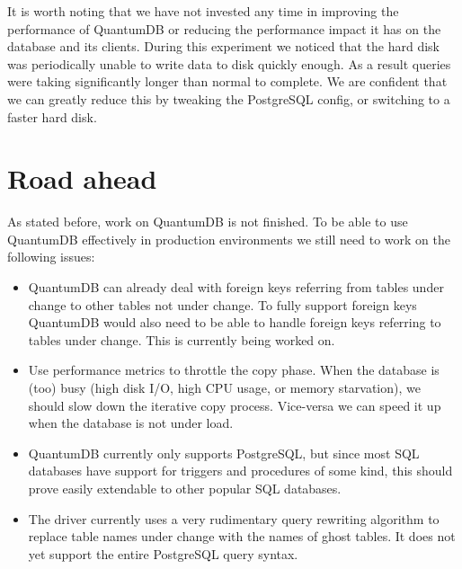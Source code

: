 \documentclass[conference]{IEEEtran}
\begin{document}
It is worth noting that we have not invested any time in improving the performance of QuantumDB or reducing the performance impact it has on the database and its clients. During this experiment we noticed that the hard disk was periodically unable to write data to disk quickly enough. As a result queries were taking significantly longer than normal to complete. We are confident that we can greatly reduce this by tweaking the PostgreSQL config, or switching to a faster hard disk.

\section{Road ahead}
As stated before, work on QuantumDB is not finished. To be able to use QuantumDB effectively in production environments we still need to work on the following issues: 

\begin{itemize}
  \item{QuantumDB can already deal with foreign keys referring from tables under change to other tables not under change. To fully support foreign keys QuantumDB would also need to be able to handle foreign keys referring to tables under change. This is currently being worked on.}
  \item{Use performance metrics to throttle the copy phase. When the database is (too) busy (high disk I/O, high CPU usage, or memory starvation), we should slow down the iterative copy process. Vice-versa we can speed it up when the database is not under load.}
  \item{QuantumDB currently only supports PostgreSQL, but since most SQL databases have support for triggers and procedures of some kind, this should prove easily extendable to other popular SQL databases.}
  \item{The driver currently uses a very rudimentary query rewriting algorithm to replace table names under change with the names of ghost tables. It does not yet support the entire PostgreSQL query syntax.}
\end{itemize}



%
%
\end{document}
